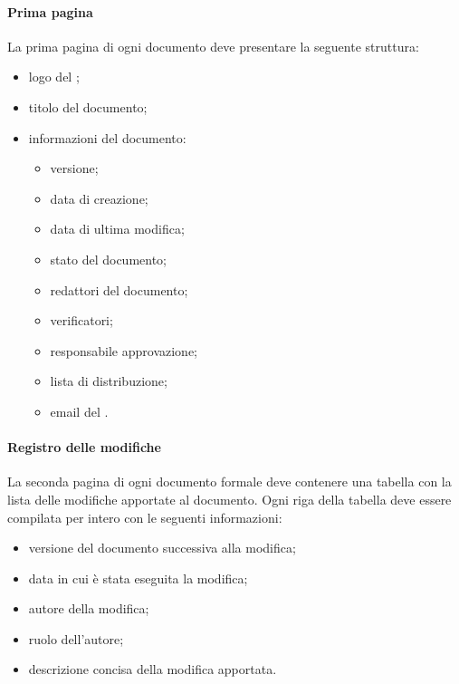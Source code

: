                 \paragraph{Prima pagina}
                La prima pagina di ogni documento deve presentare la seguente struttura:
                \begin{itemize}
                    \item logo del ;
                    \item titolo del documento;
                    \item informazioni del documento:
                    \begin{itemize}
                        \item versione;
                        \item data di creazione;
                        \item data di ultima modifica;
                        \item stato del documento;
                        \item redattori del documento;
                        \item verificatori;
                        \item responsabile approvazione;
                        \item lista di distribuzione;
                        \item email del .
                    \end{itemize}
                \end{itemize}
                \paragraph{Registro delle modifiche}
                La seconda pagina di ogni documento formale deve contenere una tabella con la lista delle modifiche apportate al documento. Ogni riga della tabella deve essere compilata per intero con le seguenti informazioni:
                \begin{itemize}
                    \item versione del documento successiva alla modifica;
                    \item data in cui è stata eseguita la modifica;
                    \item autore della modifica;
                    \item ruolo dell'autore;
                    \item descrizione concisa della modifica apportata.
                \end{itemize}
